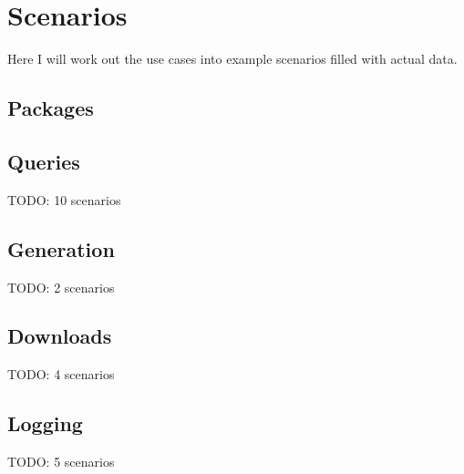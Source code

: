 \newpage
\section{Scenarios}  
Here I will work out the use cases into example scenarios filled with actual
data.


\subsection{Packages}









\subsection{Queries}
TODO: 10 scenarios


%
%
%
%
%
%
%
%
%
%


\subsection{Generation}
TODO: 2 scenarios
%
%


\subsection{Downloads}
TODO: 4 scenarios
%
%
%
%


\subsection{Logging}
TODO: 5 scenarios
%
%
%
%
%


